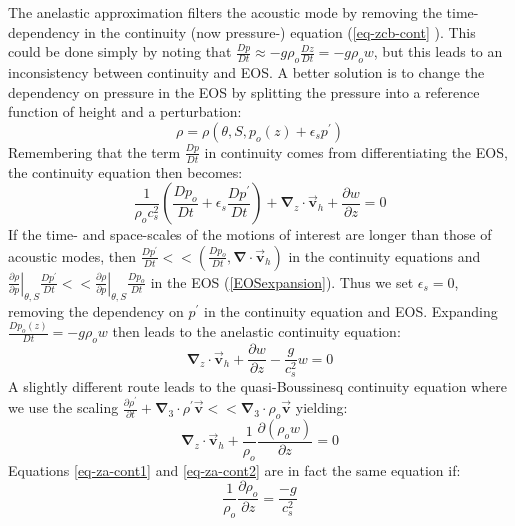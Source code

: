 The anelastic approximation filters the acoustic mode by removing the
time-dependency in the continuity (now pressure-) equation (\ref{eq-zcb-cont}
). This could be done simply by noting that $\frac{Dp}{Dt}\approx -g\rho _{o}
\frac{Dz}{Dt}=-g\rho _{o}w$, but this leads to an inconsistency between
continuity and EOS. A better solution is to change the dependency on
pressure in the EOS by splitting the pressure into a reference function of
height and a perturbation: 
\begin{equation*}
\rho =\rho (\theta ,S,p_{o}(z)+\epsilon _{s}p^{\prime })
\end{equation*}
Remembering that the term $\frac{Dp}{Dt}$ in continuity comes from
differentiating the EOS, the continuity equation then becomes: 
\begin{equation*}
\frac{1}{\rho _{o}c_{s}^{2}}\left( \frac{Dp_{o}}{Dt}+\epsilon _{s}\frac{
Dp^{\prime }}{Dt}\right) +\mathbf{\nabla }_{z}\cdot \vec{\mathbf{v}}_{h}+
\frac{\partial w}{\partial z}=0
\end{equation*}
If the time- and space-scales of the motions of interest are longer than
those of acoustic modes, then $\frac{Dp^{\prime }}{Dt}<<(\frac{Dp_{o}}{Dt},
\mathbf{\nabla }\cdot \vec{\mathbf{v}}_{h})$ in the continuity equations and 
$\left. \frac{\partial \rho }{\partial p}\right| _{\theta ,S}\frac{
Dp^{\prime }}{Dt}<<\left. \frac{\partial \rho }{\partial p}\right| _{\theta
,S}\frac{Dp_{o}}{Dt}$ in the EOS (\ref{EOSexpansion}). Thus we set $\epsilon
_{s}=0$, removing the dependency on $p^{\prime }$ in the continuity equation
and EOS. Expanding $\frac{Dp_{o}(z)}{Dt}=-g\rho _{o}w$ then leads to the
anelastic continuity equation: 
\begin{equation}
\mathbf{\nabla }_{z}\cdot \vec{\mathbf{v}}_{h}+\frac{\partial w}{\partial z}-
\frac{g}{c_{s}^{2}}w=0  \label{eq-za-cont1}
\end{equation}
A slightly different route leads to the quasi-Boussinesq continuity equation
where we use the scaling $\frac{\partial \rho ^{\prime }}{\partial t}+
\mathbf{\nabla }_{3}\cdot \rho ^{\prime }\vec{\mathbf{v}}<<\mathbf{\nabla }
_{3}\cdot \rho _{o}\vec{\mathbf{v}}$ yielding: 
\begin{equation}
\mathbf{\nabla }_{z}\cdot \vec{\mathbf{v}}_{h}+\frac{1}{\rho _{o}}\frac{
\partial \left( \rho _{o}w\right) }{\partial z}=0  \label{eq-za-cont2}
\end{equation}
Equations \ref{eq-za-cont1} and \ref{eq-za-cont2} are in fact the same
equation if: 
\begin{equation}
\frac{1}{\rho _{o}}\frac{\partial \rho _{o}}{\partial z}=\frac{-g}{c_{s}^{2}}
\end{equation}
